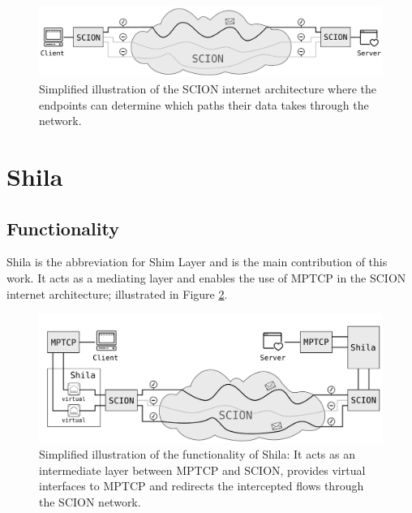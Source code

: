 \begin{figure}[H]
	\begin{center}
		\def\svgwidth{1\textwidth}
		\includegraphics[scale=0.28]{../illustrations/introduction/SCION.pdf}
		\caption[]{Simplified illustration of the SCION internet architecture where the endpoints can determine which paths their data takes through the network.}
		\label{fig:IntroSCION}
	\end{center}
\end{figure}

\section{Shila}

\subsection*{Functionality}

Shila is the abbreviation for Shim Layer and is the main contribution of this work. It acts as a mediating layer and enables the use of MPTCP in the SCION internet architecture; illustrated in Figure \ref{fig:IntroRoleOfShila}. 

\begin{figure}[H]
	\begin{center}
		\def\svgwidth{1\textwidth}
		\includegraphics[scale=0.28]{../illustrations/introduction/Shila.pdf} 
		\caption[]{Simplified illustration of the functionality of Shila: It acts as an intermediate layer between MPTCP and SCION, provides virtual interfaces to MPTCP and redirects the intercepted flows through the SCION network.}
		\label{fig:IntroRoleOfShila}
	\end{center}
\end{figure}

